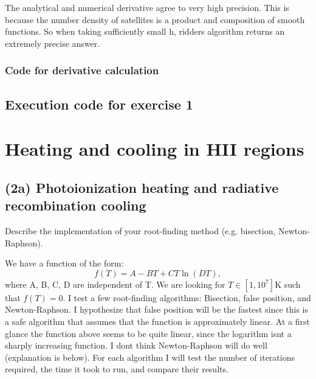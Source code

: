 \documentclass{article}
\newcommand{\CodeDir}{Code}
\begin{document}
The analytical and numerical derivative agree to very high precision. 
This is because the number density of satellites is a product and composition of smooth functions.
So when taking sufficiently small h, ridders algorithm returns an extremely precise answer.
  

\subsubsection{Code for derivative calculation}


\subsection{Execution code for exercise 1}



\section{Heating and cooling in HII regions}


\subsection{(2a) Photoionization heating and radiative recombination cooling}

Describe the implementation of your root-finding method (e.g. bisection, Newton-Raphson).

We have a function of the form:
\begin{equation}
  f(T) = A - BT + CT\ln (DT),
\end{equation}
where A, B, C, D are independent of T. We are looking for $T \in [1, 10^7]\mathrm{K}$ such that $f(T) = 0$.
I test a few root-finding algorithms: Bisection, false position, and Newton-Raphson. 
I hypothesize that false position will be the fastest since this is a safe algorithm that
assumes that the function is approximately linear. 
At a first glance the function above seems to be quite linear, since the logarithm isnt a 
sharply increasing function. I dont think Newton-Raphson will do well (explanation is below).
For each algorithm I will test the number of iterations required, the time it took to run, and compare their results.
\end{document}
